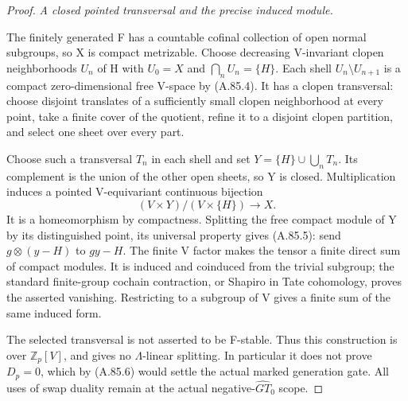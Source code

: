 \begin{proof}
\emph{A closed pointed transversal and the precise induced module.}\par
The finitely generated F has a countable cofinal collection of open
normal subgroups, so X is compact metrizable. Choose decreasing
V-invariant clopen neighborhoods \(U_n\) of H with
\(U_0=X\) and \(\bigcap_nU_n=\{H\}\). Each shell
\(U_n\setminus U_{n+1}\) is a compact zero-dimensional free
V-space by (A.85.4). It has a clopen transversal: choose disjoint
translates of a sufficiently small clopen neighborhood at every
point, take a finite cover of the quotient, refine it to a disjoint
clopen partition, and select one sheet over every part.

Choose such a transversal \(T_n\) in each shell and set
\(Y=\{H\}\cup\bigcup_nT_n\). Its complement is the union
of the other open sheets, so Y is closed. Multiplication induces
a pointed V-equivariant continuous bijection
\[
       (V\times Y)/(V\times\{H\})\longrightarrow X.
 \tag{A.85.13}
\]
It is a homeomorphism by compactness. Splitting the free compact
module of Y by its distinguished point, its universal property
gives (A.85.5): send \(g\otimes(y-H)\) to \(gy-H\).
The finite V factor makes the tensor a finite direct sum of compact
modules. It is induced and coinduced from the trivial subgroup;
the standard finite-group cochain contraction, or Shapiro in Tate
cohomology, proves the asserted vanishing. Restricting to a subgroup
of V gives a finite sum of the same induced form.

The selected transversal is not asserted to be F-stable. Thus this
construction is over \(\mathbb Z_p[V]\), and gives no
\(\Lambda\)-linear splitting. In particular it does not prove
\(D_p=0\), which by (A.85.6) would settle the actual marked
generation gate. All uses of swap duality remain at the actual
negative-\(\widehat{GT}_0\) scope.
\end{proof}
